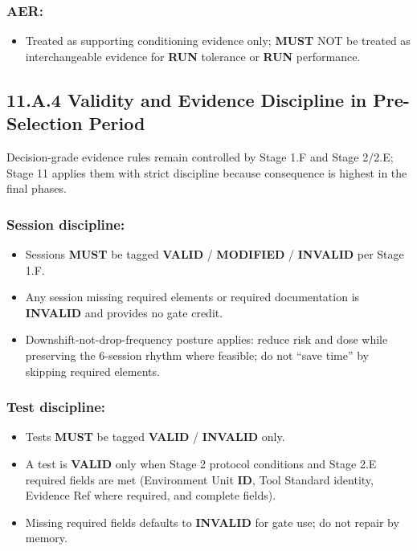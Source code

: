 \documentclass[10pt]{article}
\begin{document}
\subsubsection*{\textbf{AER}:}

\begin{itemize}
\item Treated as supporting conditioning evidence only; \textbf{MUST} NOT be treated as interchangeable evidence for \textbf{RUN} tolerance or \textbf{RUN} performance.
\end{itemize}

\newpage

\subsection*{11.A.4 Validity and Evidence Discipline in Pre-Selection Period}
{}

Decision-grade evidence rules remain controlled by Stage 1.F and Stage 2/2.E; Stage 11 applies them with strict discipline because consequence is highest in the final phases.

\subsubsection*{Session discipline:}

\begin{itemize}
\item Sessions \textbf{MUST} be tagged \textbf{VALID} / \textbf{MODIFIED} / \textbf{INVALID} per Stage 1.F.
\item Any session missing required elements or required documentation is \textbf{INVALID} and provides no gate credit.
\item Downshift-not-drop-frequency posture applies: reduce risk and dose while preserving the 6-session rhythm where feasible; do not “save time” by skipping required elements.
\end{itemize}

\subsubsection*{Test discipline:}

\begin{itemize}
\item Tests \textbf{MUST} be tagged \textbf{VALID} / \textbf{INVALID} only.
\item A test is \textbf{VALID} only when Stage 2 protocol conditions and Stage 2.E required fields are met (Environment Unit \textbf{ID}, Tool Standard identity, Evidence Ref where required, and complete fields).
\item Missing required fields defaults to \textbf{INVALID} for gate use; do not repair by memory.
\end{itemize}
\end{document}
